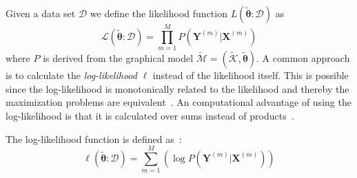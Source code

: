 \bigskip
Given a data set $\mathcal{D}$ we define the likelihood function $L(\mathbf{\tilde{\theta}}:\mathcal{D})$ as
\begin{equation}
  \label{equ:likelihood}
  \mathcal{L}\left(\mathbf{\tilde{\theta}}:\mathcal{D}\right)=\prod_{m=1}^M P\left(\mathbf{Y}^{(m)}|\mathbf{X}^{(m)}\right)
\end{equation}
where $P$ is derived from the graphical model $\mathcal{\tilde{M}}=(\mathcal{\tilde{K}},\mathbf{\tilde{\theta}})$.
A common approach is to calculate the \textit{log-likelihood} $\ell$ instead of the likelihood itself.
This is possible since the log-likelihood is monotonically related to the likelihood and thereby the maximization problems are equivalent~\citep{koller2009probabilistic}.
An computational advantage of using the log-likelihood is that it is calculated over sums instead of products~\citep{koller2009probabilistic}.

The log-likelihood function is defined as~\citep{sutton2010introduction}:
\begin{equation}
  \label{equ:log-likelihood}
  \ell\left(\mathbf{\tilde{\theta}}:\mathcal{D}\right)=\sum_{m=1}^M \left(\log P\left(\mathbf{Y}^{(m)}|\mathbf{X}^{(m)}\right)\right)
\end{equation}

